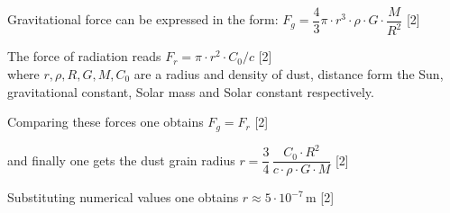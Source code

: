 Gravitational force can be expressed in the form:
$F_g = \dfrac{4}{3}\pi \cdot r^3 \cdot \rho \cdot G \cdot \dfrac{M}{R^2}$ \hfill[2]

The force of radiation reads $F_r = \pi \cdot r^2 \cdot C_0/c$ \hfill[2]\\
where $r, \rho, R, G, M, C_0$ are a radius and density of dust, distance form %
the Sun, gravitational constant, Solar mass and Solar constant respectively.

Comparing these forces one obtains $F_g = F_r$ \hfill[2]

and finally one gets the dust grain radius
$r = \dfrac{3}{4}\,\dfrac{C_0 \cdot R^2}{c \cdot \rho \cdot G \cdot M}$ \hfill[2]

Substituting numerical values one obtains $r \approx 5 \cdot 10^{-7}$\,m \hfill[2]
